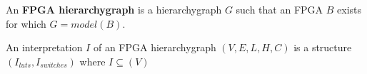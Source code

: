 \begin{defn}
An \textbf{FPGA hierarchygraph} is a hierarchygraph $G$ such that an FPGA $B$ exists for which $G=model(B)$.
\end{defn}


\begin{defn}
An interpretation $I$ of an FPGA hierarchygraph $(V,E,L,H,C)$ is a structure $(I_{luts}, I_{switches})$ where $I \subseteq (V			)$
\end{defn}
